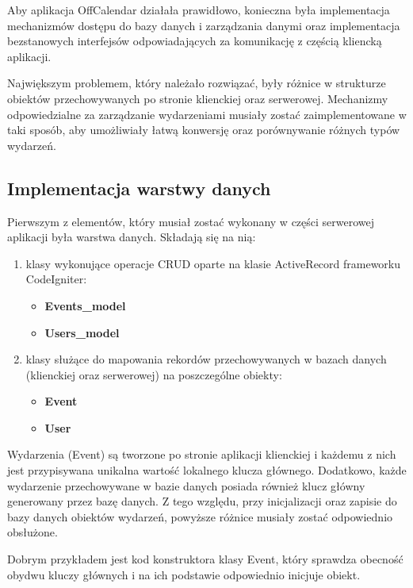 Aby aplikacja OffCalendar działała prawidłowo, konieczna była implementacja mechanizmów dostępu do bazy danych i zarządzania danymi oraz implementacja bezstanowych interfejsów odpowiadających za komunikację z częścią kliencką aplikacji.

Największym problemem, który należało rozwiązać, były różnice w strukturze obiektów przechowywanych po stronie klienckiej oraz serwerowej. Mechanizmy odpowiedzialne za zarządzanie wydarzeniami musiały zostać zaimplementowane w taki sposób, aby umożliwiały łatwą konwersję oraz porównywanie różnych typów wydarzeń.

\subsection{Implementacja warstwy danych}
\label{komBazaDanych}

Pierwszym z elementów, który musiał zostać wykonany w części serwerowej aplikacji była warstwa danych. Składają się na nią: 

\begin{enumerate}
\item klasy wykonujące operacje CRUD oparte na klasie ActiveRecord frameworku CodeIgniter:
\begin{itemize}
\item \textbf{Events\_model}
\item \textbf{Users\_model}
\end{itemize}
\item klasy służące do mapowania rekordów przechowywanych w bazach danych (klienckiej oraz serwerowej) na poszczególne obiekty:
\begin{itemize}
\item \textbf{Event}
\item \textbf{User}
\end{itemize}
\end{enumerate}

Wydarzenia (Event) są tworzone po stronie aplikacji klienckiej i każdemu z nich jest przypisywana unikalna wartość lokalnego klucza głównego. Dodatkowo, każde wydarzenie przechowywane w bazie danych posiada również klucz główny generowany przez bazę danych. Z tego względu, przy inicjalizacji oraz zapisie do bazy danych obiektów wydarzeń, powyższe różnice musiały zostać odpowiednio obsłużone.

Dobrym przykładem jest kod konstruktora klasy Event, który sprawdza obecność obydwu kluczy głównych i na ich podstawie odpowiednio inicjuje obiekt.

